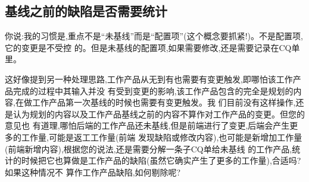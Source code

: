 \documentclass[11pt]{article}
\begin{document}
\subsection{基线之前的缺陷是否需要统计}
\qlogo \begin{staff}
你说:我的习惯是,重点不是``未基线''而是``配置项''(这个概念要抓紧!)。不是配置项,它的变更是不受控
的。但是未基线的配置项,如果需要修改,还是需要记录在CQ单里。

这好像提到另一种处理思路,工作产品从无到有也需要有变更触发,即哪怕该工作产品完成的过程中其输入并没
有受到变更的影响,该工作产品包含的完全是规划的内容,在做工作产品第一次基线的时候也需要有变更触发。我
们目前没有这样操作,还是认为规划的内容以及工作产品基线之前的内容不算作对工作产品的变更。但您的意见也
有道理,哪怕后端的工作产品还未基线,但是前端进行了变更,后端会产生更多的工作量,可能是返工工作量(前端
发现缺陷或修改内容),也可能是新增加工作量(前端新增内容),根据您的说法,还是需要分解一条子CQ单给未基线
的工作产品,统计的时候把它也算做是工作产品的缺陷(虽然它确实产生了更多的工作量),合适吗?如果这种情况不
算作工作产品缺陷,如何剔除呢?

\end{staff}
\end{document}

